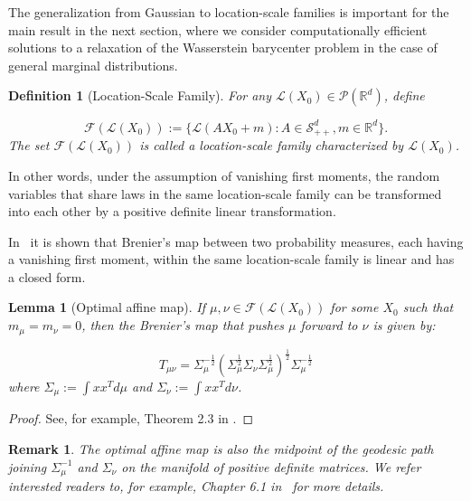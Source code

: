 \documentclass[twoside,11pt]{article}
\newtheorem{lem}{Lemma}[section]{\bfseries}{\itshape}
\newtheorem{rema}{Remark}[section]{\bfseries}{\itshape}
\newtheorem{defi}{Definition}[section]{\bfseries}{\itshape}
\begin{document}
The generalization from Gaussian to location-scale families is important for the main result in the next section, where we consider computationally efficient solutions to a relaxation of the Wasserstein barycenter problem in the case of general marginal distributions.

\begin{defi}[Location-Scale Family]
For any $\mathcal{L}(X_0) \in \mathcal{P}(\mathbb{R}^d)$, define

\begin{equation} \label{Location-scale family}
\mathcal{F}(\mathcal{L}(X_0)) := \big\{\mathcal{L}(AX_0 + m): A \in \mathcal{S}^d_{++}, m \in \mathbb{R}^d \big\}.
\end{equation}
The set $\mathcal{F}(\mathcal{L}(X_0))$ is called a location-scale family characterized by $\mathcal{L}(X_0)$.
\end{defi}

In other words, under the assumption of vanishing first moments, the random variables that share laws in the same location-scale family can be transformed into each other by a positive definite linear transformation.

In~\cite{alvarez2016fixed} it is shown that Brenier's map between two probability measures, each having a vanishing first moment, within the same location-scale family is linear and has a closed form. 

\begin{lem}[Optimal affine map] \label{l:Optimal Affine Map}
If $\mu, \nu \in \mathcal{F}(\mathcal{L}(X_0))$ for some $X_0$ such that $m_{\mu} = m_{\nu} = 0$, then the Brenier's map that pushes $\mu$ forward to $\nu$ is given by:

\begin{equation} \label{closed-form map}
T_{\mu \nu} = \Sigma_{\mu}^{-\frac{1}{2}} (\Sigma_{\mu}^{\frac{1}{2}} \Sigma_{\nu} \Sigma_{\mu}^{\frac{1}{2}} )^{\frac{1}{2}} \Sigma_{\mu}^{-\frac{1}{2}} 
\end{equation}
where $\Sigma_{\mu} := \int xx^T d\mu$ and $\Sigma_{\nu} := \int xx^T d\nu$.
\end{lem}

\begin{proof}
See, for example, Theorem 2.3 in \cite{alvarez2016fixed}.
\end{proof}

\begin{rema}
The optimal affine map is also the midpoint of the geodesic path joining $\Sigma_{\mu}^{-1}$ and $\Sigma_{\nu}$ on the manifold of positive definite matrices. We refer interested readers to, for example, Chapter 6.1 in~\cite{bhatia2009positive} for more details.
\end{rema}
\end{document}
